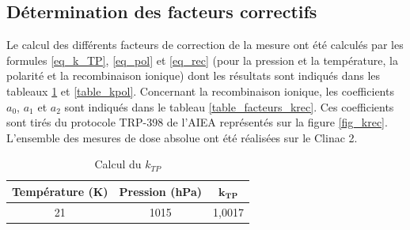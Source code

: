 \documentclass{article}
\begin{document}
\subsection{Détermination des facteurs correctifs}

Le calcul des différents facteurs de correction de la mesure ont été calculés par les formules \ref*{eq_k_TP}, \ref*{eq_pol} et \ref*{eq_rec} (pour la pression et la température, la polarité et la recombinaison ionique) dont les résultats sont indiqués dans les tableaux \ref*{table_ktp} et \ref*{table_kpol}. Concernant la recombinaison ionique, les coefficients $a_0$, $a_1$ et $a_2$ sont indiqués dans le tableau \ref*{table_facteurs_krec}. Ces coefficients sont tirés du protocole TRP-398 de l'AIEA \cite{international2001iaea} représentés sur la figure \ref*{fig_krec}. L'ensemble des mesures de dose absolue ont été réalisées sur le Clinac 2.

\begin{table}[h]
  \centering
  \begin{tabular}{ccc}
    \toprule
    \textbf{Température (K)} & \textbf{Pression (hPa)} & $\mathbf{k_{TP}}$ \\
    \toprule
    21 & 1015 & 1,0017 \\
    \bottomrule
  \end{tabular}
  \caption{Calcul du $k_{TP}$}
  \label{table_ktp}
\end{table}
\end{document}
